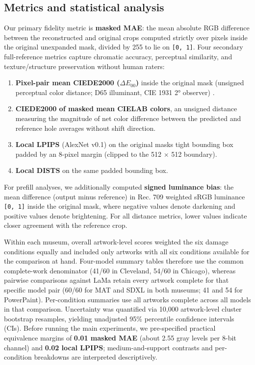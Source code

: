 \documentclass[applsci,article,submit,pdftex,moreauthors]{Definitions/mdpi}
\providecommand{\tightlist}{\setlength{\itemsep}{0pt}\setlength{\parskip}{0pt}}
\begin{document}
\subsection{Metrics and statistical analysis}\label{metrics-and-statistical-analysis}

Our primary fidelity metric is \textbf{masked MAE}: the mean absolute RGB difference between the reconstructed and original crops computed strictly over pixels inside the original unexpanded mask, divided by 255 to lie on \texttt{{[}0,\ 1{]}}. Four secondary full-reference metrics capture chromatic accuracy, perceptual similarity, and texture/structure preservation without human raters:

\begin{enumerate}
\def\labelenumi{\arabic{enumi}.}
\tightlist
\item
  \textbf{Pixel-pair mean CIEDE2000 (\texttt{\ensuremath{\Delta E_{00}}})} inside the original mask (unsigned perceptual color distance; D65 illuminant, CIE 1931 2° observer) \citep{luo2001ciede2000, sharma2005ciede2000}.
\item
  \textbf{CIEDE2000 of masked mean CIELAB colors}, an unsigned distance measuring the magnitude of net color difference between the predicted and reference hole averages without shift direction.
\item
  \textbf{Local LPIPS} (AlexNet v0.1) \citep{zhang2018lpips} on the original mask\textquotesingle s tight bounding box padded by an 8-pixel margin (clipped to the 512 \ensuremath{\times} 512 boundary).
\item
  \textbf{Local DISTS} \citep{ding2020dists} on the same padded bounding box.
\end{enumerate}

For prefill analyses, we additionally computed \textbf{signed luminance bias}: the mean difference (output minus reference) in Rec. 709 weighted sRGB luminance \texttt{{[}0,\ 1{]}} inside the original mask, where negative values denote darkening and positive values denote brightening. For all distance metrics, lower values indicate closer agreement with the reference crop.

Within each museum, overall artwork-level scores weighted the six damage conditions equally and included only artworks with all six conditions available for the comparison at hand. Four-model summary tables therefore use the common complete-work denominator (41/60 in Cleveland, 54/60 in Chicago), whereas pairwise comparisons against LaMa retain every artwork complete for that specific model pair (60/60 for MAT and SDXL in both museums; 41 and 54 for PowerPaint). Per-condition summaries use all artworks complete across all models in that comparison. Uncertainty was quantified via 10,000 artwork-level cluster bootstrap resamples, yielding unadjusted 95\% percentile confidence intervals (CIs). Before running the main experiments, we pre-specified practical equivalence margins of \textbf{0.01 masked MAE} (about 2.55 gray levels per 8-bit channel) and \textbf{0.02 local LPIPS}; medium-and-support contrasts and per-condition breakdowns are interpreted descriptively.
\end{document}
